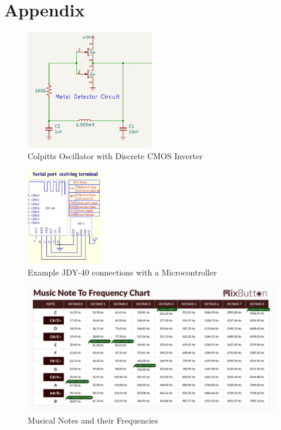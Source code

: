 \documentclass{article}
\begin{document}
\clearpage
\section{Appendix}

\begin{figure}[htbp]
    \centering
    \includegraphics[width=0.5\textwidth]{Figures/metaldetector.png}
    \caption{Colpitts Oscillator with Discrete CMOS Inverter}
    \label{fig:metaldetector}
\end{figure}

\begin{figure}[htbp]
    \centering
    \includegraphics[width=0.3\textwidth]{Figures/jdy40.png}
    \caption{Example JDY-40 connections with a Microcontroller}
    \label{fig:JDY-40}
\end{figure}

\begin{figure}[htbp]
    \centering
    \includegraphics[width=1\textwidth]{Figures/Music_Frequencies.png}
    \caption{Musical Notes and their Frequencies}
    \label{fig:music_frequencies}
\end{figure}
\end{document}
